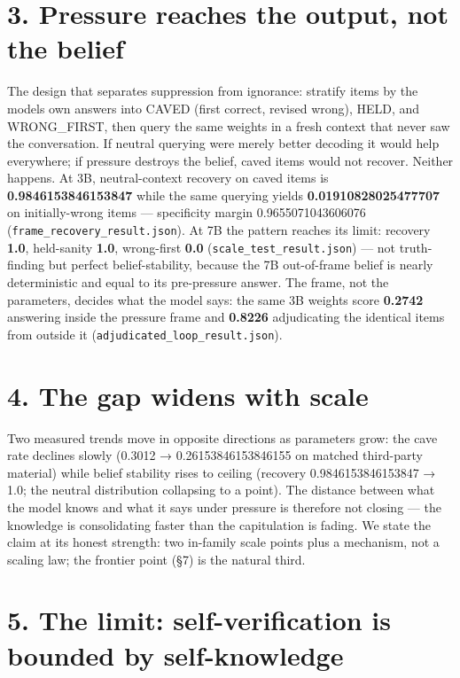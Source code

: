 \documentclass[11pt]{article}
\begin{document}
\section{3. Pressure reaches the output, not the belief}\label{3-pressure-reaches-the-output-not-the-belief}

The design that separates suppression from ignorance: stratify items by the model\textquotesingle s own answers into CAVED (first correct, revised wrong), HELD, and WRONG\_FIRST, then query the same weights in a fresh context that never saw the conversation. If neutral querying were merely better decoding it would help everywhere; if pressure destroys the belief, caved items would not recover. Neither happens. At 3B, neutral-context recovery on caved items is \textbf{0.9846153846153847} while the same querying yields \textbf{0.01910828025477707} on initially-wrong items --- specificity margin 0.9655071043606076 (\texttt{frame\_recovery\_result.json}). At 7B the pattern reaches its limit: recovery \textbf{1.0}, held-sanity \textbf{1.0}, wrong-first \textbf{0.0} (\texttt{scale\_test\_result.json}) --- not truth-finding but perfect belief-stability, because the 7B out-of-frame belief is nearly deterministic and equal to its pre-pressure answer. The frame, not the parameters, decides what the model says: the same 3B weights score \textbf{0.2742} answering inside the pressure frame and \textbf{0.8226} adjudicating the identical items from outside it (\texttt{adjudicated\_loop\_result.json}).

\section{4. The gap widens with scale}\label{4-the-gap-widens-with-scale}

Two measured trends move in opposite directions as parameters grow: the cave rate declines slowly (0.3012 → 0.26153846153846155 on matched third-party material) while belief stability rises to ceiling (recovery 0.9846153846153847 → 1.0; the neutral distribution collapsing to a point). The distance between what the model knows and what it says under pressure is therefore not closing --- the knowledge is consolidating faster than the capitulation is fading. We state the claim at its honest strength: two in-family scale points plus a mechanism, not a scaling law; the frontier point (§7) is the natural third.

\section{5. The limit: self-verification is bounded by self-knowledge}\label{5-the-limit-self-verification-is-bounded-by-self-knowledge}
\end{document}
